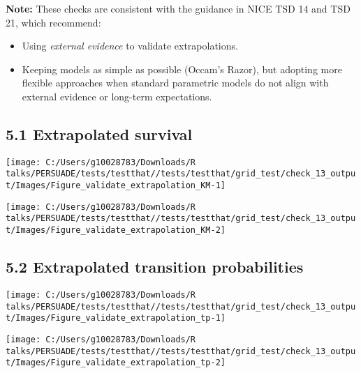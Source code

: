 \documentclass[
]{article}
\providecommand{\tightlist}{%
  \setlength{\itemsep}{0pt}\setlength{\parskip}{0pt}}
\begin{document}
\textbf{Note:} These checks are consistent with the guidance in NICE TSD
14 and TSD 21, which recommend:

\begin{itemize}
\tightlist
\item
  Using \emph{external evidence} to validate extrapolations.\\
\item
  Keeping models as simple as possible (Occam's Razor), but adopting
  more flexible approaches when standard parametric models do not align
  with external evidence or long-term expectations.
\end{itemize}

\subsection{5.1 Extrapolated survival}\label{extrapolated-survival}

\begin{flushleft}\texttt{[image: C:/Users/g10028783/Downloads/R talks/PERSUADE/tests/testthat//tests/testthat/grid\_test/check\_13\_output/Images/Figure\_validate\_extrapolation\_KM-1]} \end{flushleft}

\begin{flushleft}\texttt{[image: C:/Users/g10028783/Downloads/R talks/PERSUADE/tests/testthat//tests/testthat/grid\_test/check\_13\_output/Images/Figure\_validate\_extrapolation\_KM-2]} \end{flushleft}

\clearpage

\subsection{5.2 Extrapolated transition
probabilities}\label{extrapolated-transition-probabilities}

\begin{flushleft}\texttt{[image: C:/Users/g10028783/Downloads/R talks/PERSUADE/tests/testthat//tests/testthat/grid\_test/check\_13\_output/Images/Figure\_validate\_extrapolation\_tp-1]} \end{flushleft}

\begin{flushleft}\texttt{[image: C:/Users/g10028783/Downloads/R talks/PERSUADE/tests/testthat//tests/testthat/grid\_test/check\_13\_output/Images/Figure\_validate\_extrapolation\_tp-2]} \end{flushleft}
\end{document}
